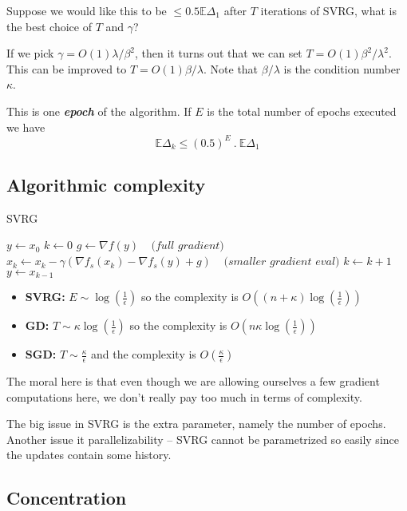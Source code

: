 \documentclass[12pt]{report}
\def \E{\mathbb E}
\begin{document}
Suppose we would like this to be $\le 0.5 \E \Delta_1$ after $T$ iterations of SVRG, what is the best choice of $T$ and $\gamma$?

If we pick $\gamma = O(1) \lambda/\beta^2$, then it turns out that we can set $T = O(1) \beta^2/\lambda^2$. This can be improved to $T = O(1) \beta/\lambda$. Note that $\beta/\lambda$ is the condition number $\kappa$. 

This is one \textbf{\textit{epoch}} of the algorithm. If $E$ is the total number of epochs executed we have
$$\E \Delta_k \le (0.5)^E \ . \ \E \Delta_1$$

\subsection{Algorithmic complexity}

\begin{algorithm}[H]
\caption{SVRG}
\begin{algorithmic}
\State $y \gets x_0 $
\State $k \gets 0$ 
	\State $g \gets \nabla f(y)\;\;\;\; \textit{(full gradient)}$
  		\State $x_k \gets x_k - \gamma (\nabla f_s(x_k) - \nabla f_s(y) +g)\;\;\;\; \textit{(smaller gradient eval)}$ 
		\State $k \gets k+1$
	\EndFor
	\State $y \gets x_{k-1}$
\EndFor
\end{algorithmic}
\end{algorithm}

\begin{itemize}
\item \textbf{SVRG:} $E \sim \log (\frac{1}{\epsilon})$ so the complexity is $O((n+\kappa) \log (\frac{1}{\epsilon}))$ 
\item \textbf{GD:}  $T \sim \kappa \log (\frac{1}{\epsilon})$ so the complexity is $O(n\kappa \log (\frac{1}{\epsilon}))$ 
\item \textbf{SGD:} $T \sim \frac{\kappa}{\epsilon}$  and the complexity is $O(\frac{\kappa}{\epsilon})$
\end{itemize}

The moral here is that even though we are allowing ourselves a few gradient computations here, we don't really pay too much in terms of complexity. 
 
The big issue in SVRG is the extra parameter, namely the number of epochs. Another issue it parallelizability -- SVRG cannot be parametrized so easily since the updates contain some history.

\subsection{Concentration}
\end{document}
